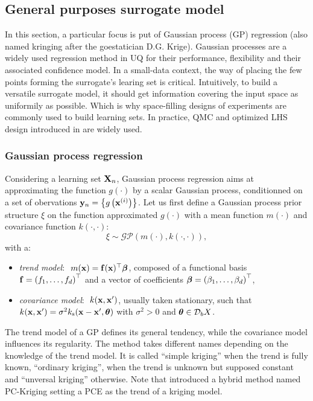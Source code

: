 \subsection{General purposes surrogate model}

In this section, a particular focus is put of Gaussian process (GP) regression (also named kringing after the goestatician D.G. Krige). 
Gaussian processes are a widely used regression method in UQ for their performance, flexibility and their associated confidence model. 
In a small-data context, the way of placing the few points forming the surrogate's learing set is critical. 
Intuitively, to build a versatile surrogate model, it should get information covering the input space as uniformily as possible. 
Which is why space-filling designs of experiments are commonly used to build learning sets.     
In practice, QMC and optimized LHS design introduced in  are widely used.  

\subsubsection{Gaussian process regression}

Considering a learning set ${\bf X}_n$, Gaussian process regression aims at approximating the function $g(\cdot)$ by a scalar Gaussian process, conditionned on a set of obervations ${\bf y}_n = \left\{g\left({\bf x}^{(i)}\right)\right\}$. 
Let us first define a Gaussian process prior structure $\xi$ on the function approximated $g(\cdot)$ with a mean function $m(\cdot)$ and covariance function $k(\cdot, \cdot)$:  
\begin{equation}
    \xi \sim \mathcal{GP}(m(\cdot), k(\cdot, \cdot)),
\end{equation} 
with a: 
\begin{itemize}
    \item \textit{trend model}: $~m({\bf x}) = \mathbf{f}({\bf x})^\top {\boldsymbol{\beta}}$, composed of a functional basis $\mathbf{f} = \left(f_1, \dots, f_d\right)^\top$ and a vector of coefficients 
    ${\boldsymbol{\beta}} = \left(\beta_1, \dots, \beta_d\right)^\top$,
    \item \textit{covariance model}: $~k({\bf x}, {\bf x}')$, usually taken stationary, such that $k({\bf x}, {\bf x}') = \sigma^2 k_{\mathrm{s}}({\bf x} - {\bf x}', {\boldsymbol{\theta}})$ with $\sigma^2>0$ and ${\boldsymbol{\theta}} \in \mathcal{D}_bX$.
\end{itemize}
The trend model of a GP defines its general tendency, while the covariance model influences its regularity.
The method takes different names depending on the knowledge of the trend model. 
It is called ``simple kriging'' when the trend is fully known, ``ordinary kriging'', when the trend is unknown but supposed constant and ``unversal kriging'' otherwise. 
Note that \cite{schobi_2015} introduced a hybrid method named PC-Kriging setting a PCE as the trend of a kriging model.   

